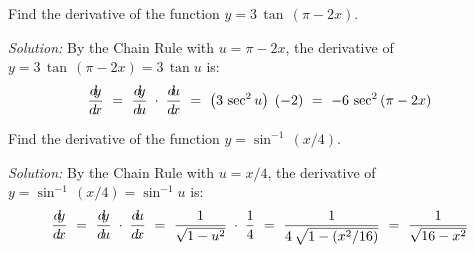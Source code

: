 \begin{exmp}\label{exmp:derivtanpi2x}
 Find the derivative of the function $y = 3\,\tan\,(\pi - 2x)$.\vspace{1mm}
 \par\noindent\emph{Solution:} By the Chain Rule with $u = \pi - 2x$, the derivative of
 $y = 3\,\tan\,(\pi - 2x) = 3\,\tan u$ is:
 \begin{displaymath}
  \frac{d\negmedspace y}{d\!x} ~=~ \frac{d\negmedspace y}{d\!u} \;\cdot\; \frac{d\negmedspace u}{d\!x} ~=~ \left(3\,\sec^2 u\right) \; (-2) ~=~ -6\,\sec^2\,(\pi - 2x)
 \end{displaymath}
\end{exmp}
\begin{exmp}\label{exmp:derivasinx4}
 Find the derivative of the function $y = \sin^{-1}\,(x/4)$.\vspace{1mm}
 \par\noindent\emph{Solution:} By the Chain Rule with $u = x/4$, the derivative of
 $y = \sin^{-1}\,(x/4) = \sin^{-1} u$ is:
 \[
  \frac{d\negmedspace y}{d\!x} ~=~ \frac{d\negmedspace y}{d\!u} \;\cdot\; \frac{d\negmedspace u}{d\!x} ~=~ \frac{1}{\sqrt{1 - u^2}} \;\cdot\; \frac{1}{4} ~=~
  \frac{1}{4\,\sqrt{1 - (x^2/16)}} ~=~ \frac{1}{\sqrt{16 - x^2}}
 \]
\end{exmp}
\divider
\vspace{3mm}
\startexercises\label{sec2dot2}
